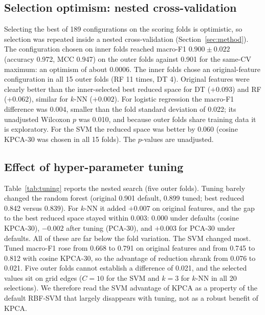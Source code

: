 \documentclass[runningheads]{llncs}
\begin{document}
\subsection{Selection optimism: nested cross-validation}\label{sec:results-nested}
Selecting the best of 189 configurations on the scoring folds is optimistic, so selection was repeated inside a nested cross-validation (Section~\ref{sec:method}). The configuration chosen on inner folds reached macro-F1 $0.900\pm0.022$ (accuracy 0.972, MCC 0.947) on the outer folds against 0.901 for the same-CV maximum: an optimism of about 0.0006. The inner folds chose an original-feature configuration in all 15 outer folds (RF 11 times, DT 4). Original features were clearly better than the inner-selected best reduced space for DT ($+0.093$) and RF ($+0.062$), similar for $k$-NN ($+0.002$). For logistic regression the macro-F1 difference was 0.004, smaller than the fold standard deviation of 0.022; its unadjusted Wilcoxon $p$ was 0.010, and because outer folds share training data it is exploratory. For the SVM the reduced space was better by 0.060 (cosine KPCA-30 was chosen in all 15 folds). The $p$-values are unadjusted.



\subsection{Effect of hyper-parameter tuning}
Table~\ref{tab:tuning} reports the nested search (five outer folds). Tuning barely changed the random forest (original 0.901 default, 0.899 tuned; best reduced 0.842 versus 0.839). For $k$-NN it added $+0.007$ on original features, and the gap to the best reduced space stayed within 0.003: 0.000 under defaults (cosine KPCA-30), $-0.002$ after tuning (PCA-30), and $+0.003$ for PCA-30 under defaults. All of these are far below the fold variation. The SVM changed most. Tuned macro-F1 rose from 0.668 to 0.791 on original features and from 0.745 to 0.812 with cosine KPCA-30, so the advantage of reduction shrank from 0.076 to 0.021. Five outer folds cannot establish a difference of 0.021, and the selected values sit on grid edges ($C=10$ for the SVM and $k=3$ for $k$-NN in all 20 selections). We therefore read the SVM advantage of KPCA as a property of the default RBF-SVM that largely disappears with tuning, not as a robust benefit of KPCA.

\begin{table}[!htbp]
\caption{Nested hyper-parameter search: mean macro-F1 over five outer folds. For each setting (default, tuned) the best reduced space among PCA-30, KPCA-cos-30 and KPCA-RBF-30 is chosen by that setting\textquoteright s own score; $\Delta$ = original $-$ reduced (negative: reduction better). K-cos-30 = KPCA, cosine kernel, 30 components. The last column gives the default-setting gap measured in the tuned-best reduced space.}\label{tab:tuning}
\centering\scriptsize
\resizebox{\textwidth}{!}{}
\end{table}
\end{document}
